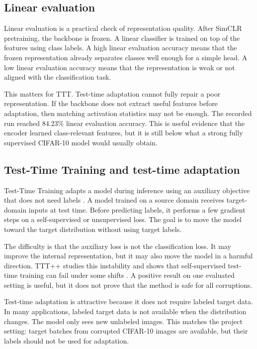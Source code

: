 \documentclass[a4paper,11pt]{article}
\begin{document}
\subsection{Linear evaluation}

Linear evaluation is a practical check of representation quality. After SimCLR pretraining, the backbone is frozen. A linear classifier is trained on top of the features using class labels. A high linear evaluation accuracy means that the frozen representation already separates classes well enough for a simple head. A low linear evaluation accuracy means that the representation is weak or not aligned with the classification task.

This matters for TTT. Test-time adaptation cannot fully repair a poor representation. If the backbone does not extract useful features before adaptation, then matching activation statistics may not be enough. The recorded run reached 84.23\% linear evaluation accuracy. This is useful evidence that the encoder learned class-relevant features, but it is still below what a strong fully supervised CIFAR-10 model would usually obtain.

\subsection{Test-Time Training and test-time adaptation}

Test-Time Training adapts a model during inference using an auxiliary objective that does not need labels \citep{sun2020ttt}. A model trained on a source domain receives target-domain inputs at test time. Before predicting labels, it performs a few gradient steps on a self-supervised or unsupervised loss. The goal is to move the model toward the target distribution without using target labels.

The difficulty is that the auxiliary loss is not the classification loss. It may improve the internal representation, but it may also move the model in a harmful direction. TTT++ studies this instability and shows that self-supervised test-time training can fail under some shifts \citep{liu2021tttpp}. A positive result on one evaluated setting is useful, but it does not prove that the method is safe for all corruptions.

Test-time adaptation is attractive because it does not require labeled target data. In many applications, labeled target data is not available when the distribution changes. The model only sees new unlabeled images. This matches the project setting: target batches from corrupted CIFAR-10 images are available, but their labels should not be used for adaptation.
\end{document}

